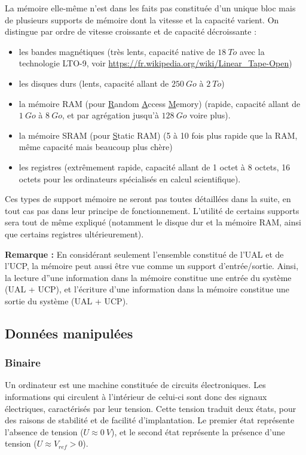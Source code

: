 \documentclass[../../main.tex]{subfiles}
\begin{document}
La mémoire elle-même n'est dans les faits pas constituée d'un unique bloc mais de plusieurs supports de mémoire dont la vitesse et la capacité varient. On distingue par ordre de vitesse croissante et de capacité décroissante :
\begin{itemize}
    \item les bandes magnétiques (très lents, capacité native de $18\ To$ avec la technologie LTO-9, voir \url{https://fr.wikipedia.org/wiki/Linear_Tape-Open})
    \item les disques durs (lents, capacité allant de $250\ Go$ à $2\ To$)
    \item la mémoire RAM (pour \underline{R}andom \underline{A}ccess \underline{M}emory) (rapide, capacité allant de $1\ Go$ à $8\ Go$, et par agrégation jusqu'à $128\ Go$ voire plus).
    \item la mémoire SRAM  (pour \underline{S}tatic RAM) (5 à 10 fois plus rapide que la RAM, même capacité mais beaucoup plus chère)
    \item les registres (extrêmement rapide, capacité allant de 1 octet à 8 octets, 16 octets pour les ordinateurs spécialisés en calcul scientifique).
\end{itemize}
Ces types de support mémoire ne seront pas toutes détaillées dans la suite, en tout cas pas dans leur principe de fonctionnement. L'utilité de certains supports sera tout de même expliqué (notamment le disque dur et la mémoire RAM, ainsi que certains registres ultérieurement).

\textbf{Remarque :} En considérant seulement l'ensemble constitué de l'UAL et de l'UCP, la mémoire peut aussi être vue comme un support d'entrée/sortie. Ainsi, la lecture d''une information dans la mémoire constitue une entrée du système (UAL + UCP), et l'écriture d'une information dans la mémoire constitue une sortie du système (UAL + UCP).
\subsection{Données manipulées}
\label{sub:donn_es_manipul_es}
\subsubsection{Binaire}
\label{ssub:binaire}
Un ordinateur est une machine constituée de circuits électroniques. Les informations qui circulent à l'intérieur de celui-ci sont donc des signaux électriques, caractérisés par leur tension. Cette tension traduit deux états, pour des raisons de stabilité et de facilité d'implantation. Le premier état représente l'absence de tension ($U \approx 0\ V$), et le second état représente la présence d'une tension ($U \approx V_{ref} > 0$).
\end{document}
